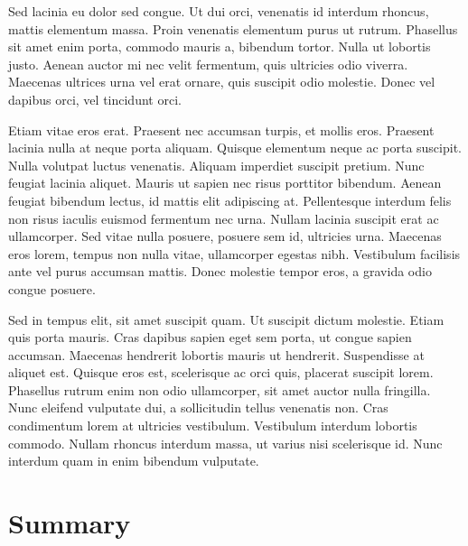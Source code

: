 \documentclass[12pt,oneside,a4paper,parskip]{scrbook}
\begin{document}
Sed lacinia eu dolor sed congue. Ut dui orci, venenatis id interdum rhoncus, mattis elementum massa. Proin venenatis elementum purus ut rutrum. Phasellus sit amet enim porta, commodo mauris a, bibendum tortor. Nulla ut lobortis justo. Aenean auctor mi nec velit fermentum, quis ultricies odio viverra. Maecenas ultrices urna vel erat ornare, quis suscipit odio molestie. Donec vel dapibus orci, vel tincidunt orci.

Etiam vitae eros erat. Praesent nec accumsan turpis, et mollis eros. Praesent lacinia nulla at neque porta aliquam. Quisque elementum neque ac porta suscipit. Nulla volutpat luctus venenatis. Aliquam imperdiet suscipit pretium. Nunc feugiat lacinia aliquet. Mauris ut sapien nec risus porttitor bibendum. Aenean feugiat bibendum lectus, id mattis elit adipiscing at. Pellentesque interdum felis non risus iaculis euismod fermentum nec urna. Nullam lacinia suscipit erat ac ullamcorper. Sed vitae nulla posuere, posuere sem id, ultricies urna. Maecenas eros lorem, tempus non nulla vitae, ullamcorper egestas nibh. Vestibulum facilisis ante vel purus accumsan mattis. Donec molestie tempor eros, a gravida odio congue posuere.

Sed in tempus elit, sit amet suscipit quam. Ut suscipit dictum molestie. Etiam quis porta mauris. Cras dapibus sapien eget sem porta, ut congue sapien accumsan. Maecenas hendrerit lobortis mauris ut hendrerit. Suspendisse at aliquet est. Quisque eros est, scelerisque ac orci quis, placerat suscipit lorem. Phasellus rutrum enim non odio ullamcorper, sit amet auctor nulla fringilla. Nunc eleifend vulputate dui, a sollicitudin tellus venenatis non. Cras condimentum lorem at ultricies vestibulum. Vestibulum interdum lobortis commodo. Nullam rhoncus interdum massa, ut varius nisi scelerisque id. Nunc interdum quam in enim bibendum vulputate.

\chapter{Summary}

\backmatter

\listoffigures
{}			

\listoftables

\end{document}
